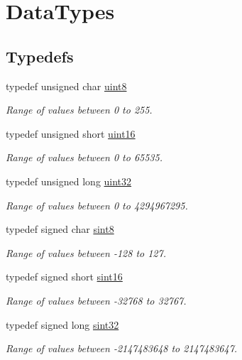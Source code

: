 \hypertarget{group__DataT}{}\section{Data\+Types}
\label{group__DataT}
\subsection*{Typedefs}
\begin{DoxyCompactItemize}
\item 
typedef unsigned char \hyperlink{group__DataT_ga4df709a77647e870bbf1d955b8edc9a6}{uint8}
\begin{DoxyCompactList}\small\item\em Range of values between 0 to 255. \end{DoxyCompactList}\item 
typedef unsigned short \hyperlink{group__DataT_ga1daa745171fc6e31d942c161422a76f9}{uint16}
\begin{DoxyCompactList}\small\item\em Range of values between 0 to 65535. \end{DoxyCompactList}\item 
typedef unsigned long \hyperlink{group__DataT_ga100e7c691a47d6978527c479a0158245}{uint32}
\begin{DoxyCompactList}\small\item\em Range of values between 0 to 4294967295. \end{DoxyCompactList}\item 
typedef signed char \hyperlink{group__DataT_gae35f10ffd0ac8dd2bc3e794da9bdfbc7}{sint8}
\begin{DoxyCompactList}\small\item\em Range of values between -\/128 to 127. \end{DoxyCompactList}\item 
typedef signed short \hyperlink{group__DataT_gabed6316797860370475b730ceb545332}{sint16}
\begin{DoxyCompactList}\small\item\em Range of values between -\/32768 to 32767. \end{DoxyCompactList}\item 
typedef signed long \hyperlink{group__DataT_ga426bf55104d8fb3f624c1fc4cd5f2d29}{sint32}
\begin{DoxyCompactList}\small\item\em Range of values between -\/2147483648 to 2147483647. \end{DoxyCompactList}\end{DoxyCompactItemize}


